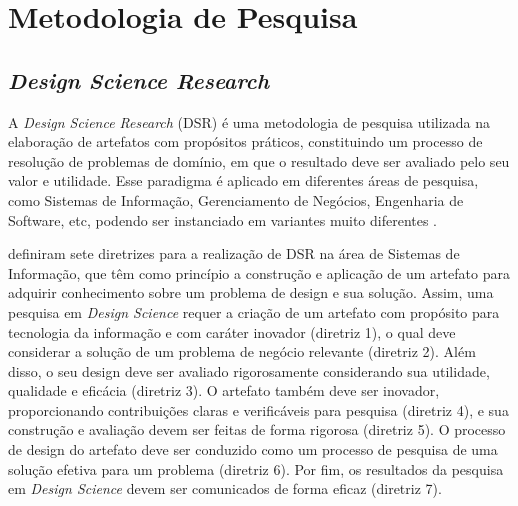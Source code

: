 
\chapter{Metodologia de Pesquisa} 


\section*{\textit{Design Science Research}}

A \textit{Design Science Research} (DSR) é uma metodologia de pesquisa utilizada na elaboração de artefatos com propósitos práticos, constituindo um processo de resolução de problemas de domínio, em que o resultado deve ser avaliado pelo seu valor e utilidade. Esse paradigma é aplicado em diferentes áreas de pesquisa, como Sistemas de Informação, Gerenciamento de Negócios, Engenharia de Software, etc, podendo ser instanciado em variantes muito diferentes \citep{dresch2015design, runeson2020design}.

\citet{hevner2004design} definiram sete diretrizes para a realização de DSR na área de Sistemas de Informação, que têm como princípio a construção e aplicação de um artefato para adquirir conhecimento sobre um problema de design e sua solução. Assim, uma pesquisa em \textit{Design Science} requer a criação de um artefato com propósito para tecnologia da informação e com caráter inovador (diretriz 1), o qual deve considerar a solução de um problema de negócio relevante (diretriz 2). Além disso, o seu design deve ser avaliado rigorosamente considerando sua utilidade, qualidade e eficácia (diretriz 3). O artefato também deve ser inovador, proporcionando contribuições claras e verificáveis para pesquisa (diretriz 4), e sua construção e avaliação devem ser feitas de forma rigorosa (diretriz 5). O processo de design do artefato deve ser conduzido como um processo de pesquisa de uma solução efetiva para um problema (diretriz 6). Por fim, os resultados da pesquisa em \textit{Design Science} devem ser comunicados de forma eficaz (diretriz 7).

